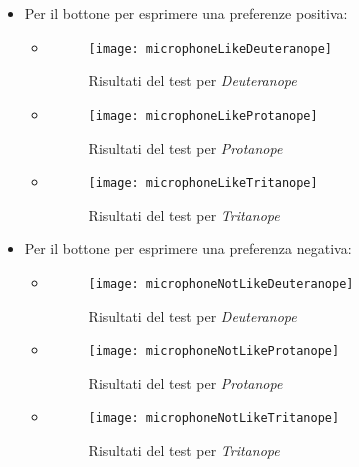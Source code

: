 \begin{itemize}

    \item Per il bottone per esprimere una preferenze positiva:
    \begin{itemize}

        \item[]
            \begin{figure}[H]

                \centering
                \texttt{[image: microphoneLikeDeuteranope]}
                \caption{Risultati del test per \textit{Deuteranope}}
            \end{figure}

        \item[]
            \begin{figure}[H]

                \centering
                \texttt{[image: microphoneLikeProtanope]}
                \caption{Risultati del test per \textit{Protanope}}
            \end{figure}

        \item[]
            \begin{figure}[H]

                \centering
                \texttt{[image: microphoneLikeTritanope]}
                \caption{Risultati del test per \textit{Tritanope}}
            \end{figure}

    \end{itemize}

    \item Per il bottone per esprimere una preferenza negativa:
    \begin{itemize}

        \item[]
        \begin{figure}[H]

            \centering
            \texttt{[image: microphoneNotLikeDeuteranope]}
            \caption{Risultati del test per \textit{Deuteranope}}
        \end{figure}

        \item[]
        \begin{figure}[H]

            \centering
            \texttt{[image: microphoneNotLikeProtanope]}
            \caption{Risultati del test per \textit{Protanope}}
        \end{figure}

        \item[]
        \begin{figure}[H]

            \centering
            \texttt{[image: microphoneNotLikeTritanope]}
            \caption{Risultati del test per \textit{Tritanope}}
        \end{figure}
    \end{itemize}

\end{itemize}

